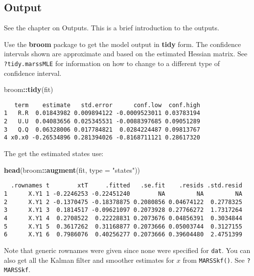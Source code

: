 \documentclass[12pt,]{book}
\newenvironment{Shaded}{\begin{snugshade}}{\end{snugshade}}
\newcommand{\DataTypeTok}[1]{\textcolor[rgb]{0.13,0.29,0.53}{#1}}
\newcommand{\KeywordTok}[1]{\textcolor[rgb]{0.13,0.29,0.53}{\textbf{#1}}}
\newcommand{\NormalTok}[1]{#1}
\newcommand{\OperatorTok}[1]{\textcolor[rgb]{0.81,0.36,0.00}{\textbf{#1}}}
\newcommand{\StringTok}[1]{\textcolor[rgb]{0.31,0.60,0.02}{#1}}
\begin{document}
\hypertarget{output}{%
\subsection{Output}\label{output}}

See the chapter on Outputs. This is a brief introduction to the outputs.

Use the \textbf{broom} package to get the model output in \textbf{tidy} form. The confidence intervals shown are approximate and based on the estimated Hessian matrix. See \texttt{?tidy.marssMLE} for information on how to change to a different type of confidence interval.

\begin{Shaded}
\begin{Highlighting}[]
\NormalTok{broom}\OperatorTok{::}\KeywordTok{tidy}\NormalTok{(fit)}
\end{Highlighting}
\end{Shaded}

\begin{verbatim}
   term    estimate   std.error      conf.low  conf.high
1   R.R  0.01843982 0.009894122 -0.0009523011 0.03783194
2   U.U  0.04083656 0.025345531 -0.0088397685 0.09051289
3   Q.Q  0.06328006 0.017784821  0.0284224487 0.09813767
4 x0.x0 -0.26534896 0.281394026 -0.8168711121 0.28617320
\end{verbatim}

The get the estimated states use:

\begin{Shaded}
\begin{Highlighting}[]
\KeywordTok{head}\NormalTok{(broom}\OperatorTok{::}\KeywordTok{augment}\NormalTok{(fit, }\DataTypeTok{type =} \StringTok{"states"}\NormalTok{))}
\end{Highlighting}
\end{Shaded}

\begin{verbatim}
  .rownames t        xtT     .fitted   .se.fit    .resids .std.resid
1      X.Y1 1 -0.2246253 -0.22451240        NA         NA         NA
2      X.Y1 2 -0.1370475 -0.18378875 0.2080856 0.04674122  0.2778325
3      X.Y1 3  0.1814517 -0.09621097 0.2073928 0.27766272  1.7317264
4      X.Y1 4  0.2708522  0.22228831 0.2073676 0.04856391  0.3034844
5      X.Y1 5  0.3617262  0.31168877 0.2073666 0.05003744  0.3127155
6      X.Y1 6  0.7986076  0.40256277 0.2073666 0.39604480  2.4751399
\end{verbatim}

Note that generic rownames were given since none were specified for \texttt{dat}.
You can also get all the Kalman filter and smoother estimates for \(x\) from \texttt{MARSSkf()}. See \texttt{?MARSSkf}.
\end{document}
